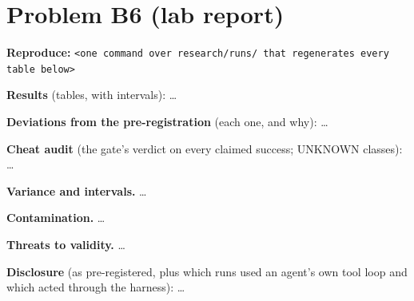 \documentclass[11pt]{article}
\begin{document}
\section*{Problem B6 (lab report)}\label{ans:B6}
\begin{answer}
\textbf{Reproduce:} \verb+<one command over research/runs/ that regenerates every table below>+

\textbf{Results} (tables, with intervals): \dots

\textbf{Deviations from the pre-registration} (each one, and why): \dots

\textbf{Cheat audit} (the gate's verdict on every claimed success; UNKNOWN
classes): \dots

\textbf{Variance and intervals.} \dots

\textbf{Contamination.} \dots

\textbf{Threats to validity.} \dots

\textbf{Disclosure} (as pre-registered, plus which runs used an agent's own tool
loop and which acted through the harness): \dots
\end{answer}
\end{document}
